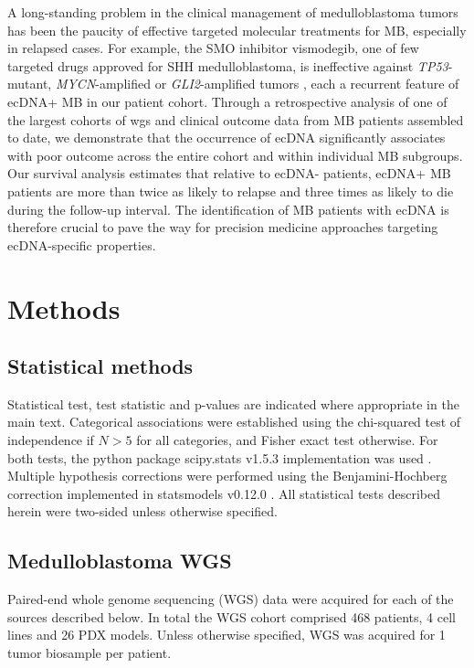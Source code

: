 \par A long-standing problem in the clinical management of medulloblastoma tumors has been the paucity of effective targeted molecular treatments for MB, especially in relapsed cases. For example, the SMO inhibitor vismodegib, one of few targeted drugs approved for SHH medulloblastoma, is ineffective against \textit{TP53}-mutant, \textit{MYCN}-amplified or \textit{GLI2}-amplified tumors \cite{robinson_2015}, each a recurrent feature of ecDNA+ MB in our patient cohort. Through a retrospective analysis of one of the largest cohorts of \gls{wgs} and clinical outcome data from MB patients assembled to date, we demonstrate that the occurrence of ecDNA significantly associates with poor outcome across the entire cohort and within individual MB subgroups. Our survival analysis estimates that relative to ecDNA- patients, ecDNA+ MB patients are more than twice as likely to relapse and three times as likely to die during the follow-up interval. The identification of MB patients with ecDNA is therefore crucial to pave the way for precision medicine approaches targeting ecDNA-specific properties.

\section{Methods}
\label{chap1:methods}
\subsection{Statistical methods}
Statistical test, test statistic and p-values are indicated where appropriate in the main text. Categorical associations were established using the chi-squared test of independence if $N>5$ for all categories, and Fisher exact test otherwise. For both tests, the python package scipy.stats v1.5.3 implementation was used \cite{scipy}. Multiple hypothesis corrections were performed using the Benjamini-Hochberg correction \cite{bh} implemented in statsmodels v0.12.0 \cite{statsmodels}. All statistical tests described herein were two-sided unless otherwise specified.

\subsection{Medulloblastoma WGS}
Paired-end whole genome sequencing (WGS) data were acquired for each of the sources described below. In total the WGS cohort comprised 468 patients, 4 cell lines and 26 PDX models. Unless otherwise specified, WGS was acquired for 1 tumor biosample per patient.

